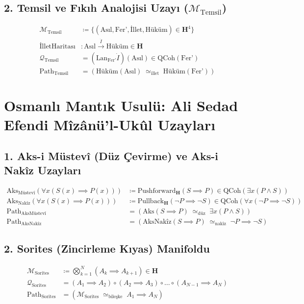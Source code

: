 \documentclass[11pt, a4paper]{article}
\begin{document}
\subsection{2. Temsil ve Fıkıh Analojisi Uzayı ($\mathcal{M}_{\text{Temsil}}$)}
\begin{align}
\mathcal{M}_{\text{Temsil}} &\coloneqq \{ (\text{Asıl}, \text{Fer'}, \text{İllet}, \text{Hüküm}) \in \mathbf{H}^4 \} \\
\text{İlletHaritası} &: \text{Asıl} \xrightarrow{\;\dot{I}\;} \text{Hüküm} \in \mathbf{H} \\
\mathcal{Q}_{\text{Temsil}} &= (\text{Lan}_{\text{Fer'}} \dot{I})(\text{Asıl}) \in \text{QCoh}(\text{Fer'}) \\
\text{Path}_{\text{Temsil}} &= (\text{Hüküm}(\text{Asıl}) \;\simeq_{\text{illet}}\; \text{Hüküm}(\text{Fer'}))
\end{align}

\section{Osmanlı Mantık Usulü: Ali Sedad Efendi Mîzânü'l-Ukûl Uzayları}

\subsection{1. Aks-i Müstevî (Düz Çevirme) ve Aks-i Nakîz Uzayları}
\begin{align}
\text{Aks}_{\text{Müstevî}}(\forall x (S(x) \implies P(x))) &\coloneqq \text{Pushforward}_{\mathbf{H}}(S \implies P) \in \text{QCoh}(\exists x (P \land S)) \\
\text{Aks}_{\text{Nakîz}}(\forall x (S(x) \implies P(x))) &\coloneqq \text{Pullback}_{\mathbf{H}}(\neg P \implies \neg S) \in \text{QCoh}(\forall x (\neg P \implies \neg S)) \\
\text{Path}_{\text{AksMüstevî}} &= (\text{Aks}(S \implies P) \;\simeq_{\text{düz}}\; \exists x (P \land S)) \\
\text{Path}_{\text{AksNakîz}} &= (\text{AksNakîz}(S \implies P) \;\simeq_{\text{nakîz}}\; \neg P \implies \neg S)
\end{align}

\subsection{2. Sorites (Zincirleme Kıyas) Manifoldu}
\begin{align}
\mathcal{M}_{\text{Sorites}} &\coloneqq \bigotimes_{k=1}^N (A_k \implies A_{k+1}) \in \mathbf{H} \\
\mathcal{Q}_{\text{Sorites}} &= (A_1 \implies A_2) \circ (A_2 \implies A_3) \circ \dots \circ (A_{N-1} \implies A_N) \\
\text{Path}_{\text{Sorites}} &= (\mathcal{M}_{\text{Sorites}} \;\simeq_{\text{bileşke}}\; A_1 \implies A_N)
\end{align}
\end{document}

